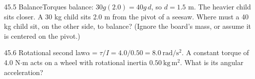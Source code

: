 \documentclass[11pt]{article}
\begin{document}
\begin{q}{4}{5.5 Balance}{Torques balance: $30g(2.0) = 40g\,d$, so $d = 1.5$ m. The heavier child sits closer.}
A 30 kg child sits 2.0 m from the pivot of a seesaw. Where must a 40 kg child sit, on the other side, to balance? (Ignore the board's mass, or assume it is centered on the pivot.)
\end{q}
\begin{q}{4}{5.6 Rotational second law}{$\alpha = \tau/I = 4.0/0.50 = 8.0\ \mathrm{rad/s^2}$.}
A constant torque of 4.0 N$\cdot$m acts on a wheel with rotational inertia $0.50\ \mathrm{kg\,m^2}$. What is its angular acceleration?
\end{q}

\makekey
\end{document}
